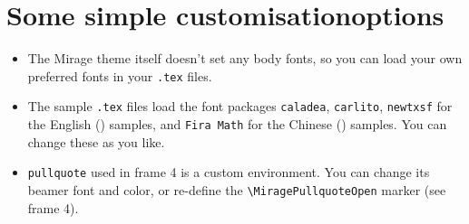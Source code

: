 \documentclass{article}
\begin{document}
\begin{paracol}{2}
\begin{center}
\end{center}

\switchcolumn*

\section{Some simple customisationoptions}

\begin{itemize}
\item The Mirage theme itself doesn't set any body fonts, so you can load your own preferred fonts in your \texttt{.tex} files.

\item  The sample \texttt{.tex} files load the font packages \texttt{caladea}, \texttt{carlito}, \texttt{newtxsf} for the English () samples, and \texttt{Fira Math} for the Chinese () samples. You can change these as you like.

\item \texttt{pullquote} used in frame 4 is a custom environment. You can change its beamer font and color, or re-define the \verb|\MiragePullquoteOpen| marker (see frame 4).


\end{itemize}
\end{paracol}
\end{document}
